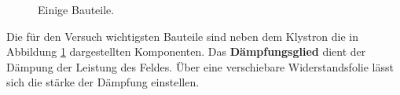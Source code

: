 \begin{figure}
    \label{fig:bauteile}
    \centering
    \qquad
    \qquad
    \caption{Einige Bauteile.}
  \end{figure}

Die für den Versuch wichtigsten Bauteile sind neben dem Klystron die in Abbildung \ref{fig:bauteile} dargestellten Komponenten.
Das \textbf{Dämpfungsglied} dient der Dämpung der Leistung des Feldes. Über eine verschiebare Widerstandsfolie lässt sich die stärke der Dämpfung einstellen. 









